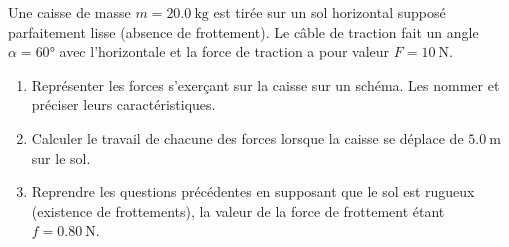 Une caisse de masse $m=\qty{20.0}{\kg}$ est tirée sur un sol horizontal supposé
parfaitement lisse (absence de frottement). Le câble de traction fait un angle
$\alpha=\ang{60}$ avec l'horizontale et la force de traction a pour valeur
$F=\qty{10}{\N}$.
\begin{enumerate}
    \item Représenter les forces s'exerçant sur la caisse sur un schéma. Les
          nommer et préciser leurs caractéristiques.
    \item Calculer le travail de chacune des forces lorsque la caisse se déplace
          de $\qty{5.0}{\m}$ sur le sol.
    \item Reprendre les questions précédentes en supposant que le sol est
          rugueux (existence de frottements), la valeur de la force de
          frottement étant $f=\qty{0.80}{\N}$.
\end{enumerate}
